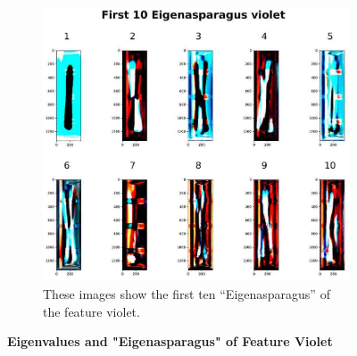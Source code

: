 \begin{figure}[H]
	\begin{subfigure}{0.9\textwidth}
		\includegraphics[width=0.9\linewidth]{Figures/chapter04/pca_violet.png}
		\caption{These images show the first ten “Eigenasparagus” of the feature violet.}
	\end{subfigure}
    \caption[First ten Eigenvalues and "Eigenasparagus" of Feature Violet]{\textbf{Eigenvalues and "Eigenasparagus" of Feature Violet}}
    \label{fig:PCAviolet}
\end{figure}


